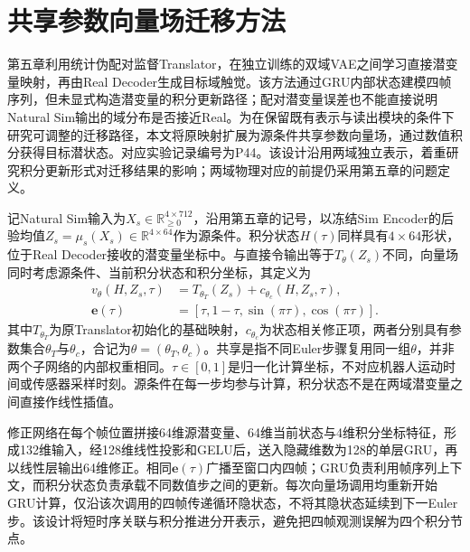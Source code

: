 \section{共享参数向量场迁移方法}
\label{sec:ch06_shared_vector_field}

第五章利用统计伪配对监督Translator，在独立训练的双域VAE之间学习直接潜变量映射，再由Real Decoder生成目标域触觉。该方法通过GRU内部状态建模四帧序列，但未显式构造潜变量的积分更新路径；配对潜变量误差也不能直接说明Natural Sim输出的域分布是否接近Real。为在保留既有表示与读出模块的条件下研究可调整的迁移路径，本文将原映射扩展为源条件共享参数向量场，通过数值积分获得目标潜状态。对应实验记录编号为P44。该设计沿用两域独立表示，着重研究积分更新形式对迁移结果的影响；两域物理对应的前提仍采用第五章的问题定义。

记Natural Sim输入为$X_s\in\mathbb R_{\ge0}^{4\times712}$，沿用第五章的记号，以冻结Sim Encoder的后验均值$Z_s=\mu_s(X_s)\in\mathbb R^{4\times64}$作为源条件。积分状态$H(\tau)$同样具有$4\times64$形状，位于Real Decoder接收的潜变量坐标中。与直接令输出等于$T_\theta(Z_s)$不同，向量场同时考虑源条件、当前积分状态和积分坐标，其定义为
\begin{equation}
 \begin{aligned}
 v_\theta(H,Z_s,\tau)&=T_{\theta_T}(Z_s)+c_{\theta_c}(H,Z_s,\tau),\\
 \boldsymbol e(\tau)&=[\tau,1-\tau,\sin(\pi\tau),\cos(\pi\tau)].
 \end{aligned}
 \label{eq:ch06_vector_field}
\end{equation}
其中$T_{\theta_T}$为原Translator初始化的基础映射，$c_{\theta_c}$为状态相关修正项，两者分别具有参数集合$\theta_T$与$\theta_c$，合记为$\theta=(\theta_T,\theta_c)$。共享是指不同Euler步骤复用同一组$\theta$，并非两个子网络的内部权重相同。$\tau\in[0,1]$是归一化计算坐标，不对应机器人运动时间或传感器采样时刻。源条件在每一步均参与计算，积分状态不是在两域潜变量之间直接作线性插值。

修正网络在每个帧位置拼接64维源潜变量、64维当前状态与4维积分坐标特征，形成132维输入，经128维线性投影和GELU后，送入隐藏维数为128的单层GRU，再以线性层输出64维修正。相同$\boldsymbol e(\tau)$广播至窗口内四帧；GRU负责利用帧序列上下文，而积分状态负责承载不同数值步之间的更新。每次向量场调用均重新开始GRU计算，仅沿该次调用的四帧传递循环隐状态，不将其隐状态延续到下一Euler步。该设计将短时序关联与积分推进分开表示，避免把四帧观测误解为四个积分节点。

